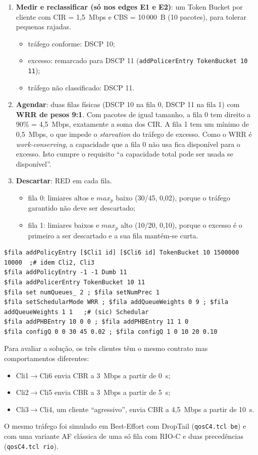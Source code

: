 \IfFileExists{llncs.cls}{\documentclass[runningheads]{llncs}}{\documentclass{article}}
\begin{document}
\begin{enumerate}
\item \textbf{Medir e reclassificar (só nos edges E1 e E2)}: um Token Bucket por cliente com
CIR = 1,5~Mbps e CBS = 10\,000~B (10 pacotes), para tolerar pequenas rajadas.
\begin{itemize}
\item tráfego conforme: DSCP 10;
\item excesso: remarcado para DSCP 11 (\texttt{addPolicerEntry TokenBucket 10 11});
\item tráfego não classificado: DSCP 11.
\end{itemize}
\item \textbf{Agendar}: duas filas físicas (DSCP 10 na fila 0, DSCP 11 na fila 1) com
\textbf{WRR de pesos 9:1}. Com pacotes de igual tamanho, a fila 0 tem direito a 90\% =
4,5~Mbps, exatamente a soma dos CIR. A fila 1 tem um mínimo de 0,5~Mbps, o que impede o
\emph{starvation} do tráfego de excesso. Como o WRR é \emph{work-conserving}, a capacidade
que a fila 0 não usa fica disponível para o excesso. Isto cumpre o requisito ``a capacidade
total pode ser usada se disponível''.
\item \textbf{Descartar}: RED em cada fila.
\begin{itemize}
\item fila 0: limiares altos e $max_p$ baixo (30/45, 0,02), porque o tráfego garantido não
deve ser descartado;
\item fila 1: limiares baixos e $max_p$ alto (10/20, 0,10), porque o excesso é o primeiro a
ser descartado e a sua fila mantém-se curta.
\end{itemize}
\end{enumerate}

\begin{lstlisting}
$fila addPolicyEntry [$Cli1 id] [$Cli6 id] TokenBucket 10 1500000 10000  ;# idem Cli2, Cli3
$fila addPolicyEntry -1 -1 Dumb 11
$fila addPolicerEntry TokenBucket 10 11
$fila set numQueues_ 2 ; $fila setNumPrec 1
$fila setSchedularMode WRR ; $fila addQueueWeights 0 9 ; $fila addQueueWeights 1 1   ;# (sic) Schedular
$fila addPHBEntry 10 0 0 ; $fila addPHBEntry 11 1 0
$fila configQ 0 0 30 45 0.02 ; $fila configQ 1 0 10 20 0.10
\end{lstlisting}

Para avaliar a solução, os três clientes têm o mesmo contrato mas comportamentos diferentes:
\begin{itemize}
\item Cli1$\rightarrow$Cli6 envia CBR a 3~Mbps a partir de 0~s;
\item Cli2$\rightarrow$Cli5 envia CBR a 3~Mbps a partir de 5~s;
\item Cli3$\rightarrow$Cli4, um cliente ``agressivo'', envia CBR a 4,5~Mbps a partir de 10~s.
\end{itemize}
O mesmo tráfego foi simulado em Best-Effort com DropTail (\texttt{qosC4.tcl be}) e com uma
variante AF clássica de uma só fila com RIO-C e duas precedências (\texttt{qosC4.tcl rio}).
\end{document}
